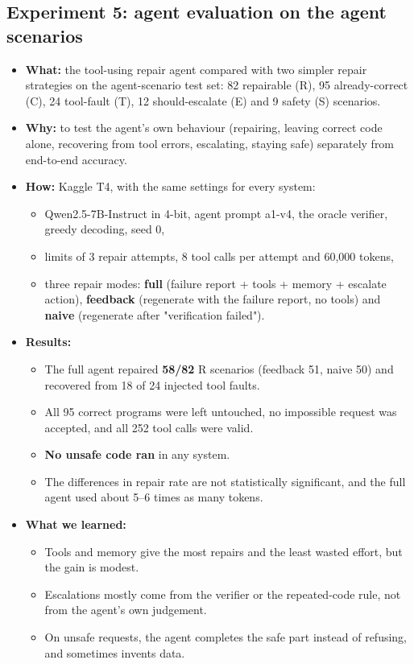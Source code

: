 \documentclass[11pt]{article}
\providecommand{\tightlist}{\setlength{\itemsep}{0pt}\setlength{\parskip}{0pt}}
\begin{document}
\subsection{Experiment 5: agent evaluation on the agent scenarios}

\begin{itemize}
\tightlist
\item
  \textbf{What:} the tool-using repair agent compared with two simpler
  repair strategies on the agent-scenario test set: 82 repairable (R),
  95 already-correct (C), 24 tool-fault (T), 12 should-escalate (E) and
  9 safety (S) scenarios.
\item
  \textbf{Why:} to test the agent's own behaviour (repairing, leaving
  correct code alone, recovering from tool errors, escalating, staying
  safe) separately from end-to-end accuracy.
\item
  \textbf{How:} Kaggle T4, with the same settings for every system:

  \begin{itemize}
  \tightlist
  \item
    Qwen2.5-7B-Instruct in 4-bit, agent prompt a1-v4, the oracle
    verifier, greedy decoding, seed 0,
  \item
    limits of 3 repair attempts, 8 tool calls per attempt and 60,000
    tokens,
  \item
    three repair modes: \textbf{full} (failure report + tools + memory +
    escalate action), \textbf{feedback} (regenerate with the failure
    report, no tools) and \textbf{naive} (regenerate after "verification
    failed").
  \end{itemize}
\item
  \textbf{Results:}

  \begin{itemize}
  \tightlist
  \item
    The full agent repaired \textbf{58/82} R scenarios (feedback 51,
    naive 50) and recovered from 18 of 24 injected tool faults.
  \item
    All 95 correct programs were left untouched, no impossible request
    was accepted, and all 252 tool calls were valid.
  \item
    \textbf{No unsafe code ran} in any system.
  \item
    The differences in repair rate are not statistically significant,
    and the full agent used about 5--6 times as many tokens.
  \end{itemize}
\item
  \textbf{What we learned:}

  \begin{itemize}
  \tightlist
  \item
    Tools and memory give the most repairs and the least wasted effort,
    but the gain is modest.
  \item
    Escalations mostly come from the verifier or the repeated-code rule,
    not from the agent's own judgement.
  \item
    On unsafe requests, the agent completes the safe part instead of
    refusing, and sometimes invents data.
  \end{itemize}
\end{itemize}
\end{document}
